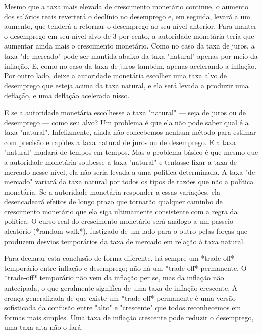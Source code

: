 \documentclass[12pt]{article}
\begin{document}
Mesmo que a taxa mais elevada de crescimento monetário continue, o aumento dos salários reais reverterá o declínio no desemprego e, em seguida, levará a um aumento, que tenderá a retornar o desemprego ao seu nível anterior. Para manter o desemprego em seu nível alvo de 3 por cento, a autoridade monetária teria que aumentar ainda mais o crescimento monetário. Como no caso da taxa de juros, a taxa "de mercado" pode ser mantida abaixo da taxa "natural" apenas por meio da inflação. E, como no caso da taxa de juros também, apenas acelerando a inflação. Por outro lado, deixe a autoridade monetária escolher uma taxa alvo de desemprego que esteja acima da taxa natural, e ela será levada a produzir uma deflação, e uma deflação acelerada nisso.

E se a autoridade monetária escolhesse a taxa "natural" — seja de juros ou de desemprego — como seu alvo? Um problema é que ela não pode saber qual é a taxa "natural". Infelizmente, ainda não concebemos nenhum método para estimar com precisão e rapidez a taxa natural de juros ou de desemprego. E a taxa "natural" mudará de tempos em tempos. Mas o problema básico é que mesmo que a autoridade monetária soubesse a taxa "natural" e tentasse fixar a taxa de mercado nesse nível, ela não seria levada a uma política determinada. A taxa "de mercado" variará da taxa natural por todos os tipos de razões que não a política monetária. Se a autoridade monetária responder a essas variações, ela desencadeará efeitos de longo prazo que tornarão qualquer caminho de crescimento monetário que ela siga ultimamente consistente com a regra da política. O curso real do crescimento monetário será análogo a um passeio aleatório (*random walk*), fustigado de um lado para o outro pelas forças que produzem desvios temporários da taxa de mercado em relação à taxa natural.

Para declarar esta conclusão de forma diferente, há sempre um *trade-off* temporário entre inflação e desemprego; não há um *trade-off* permanente. O *trade-off* temporário não vem da inflação per se, mas da inflação não antecipada, o que geralmente significa de uma taxa de inflação crescente. A crença generalizada de que existe um *trade-off* permanente é uma versão sofisticada da confusão entre "alto" e "crescente" que todos reconhecemos em formas mais simples. Uma taxa de inflação crescente pode reduzir o desemprego, uma taxa alta não o fará.
\end{document}
